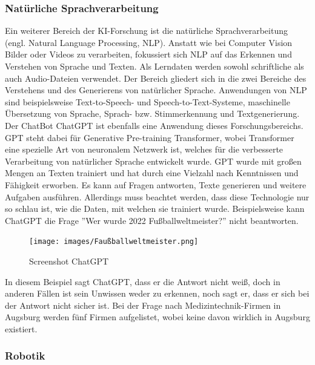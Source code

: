 \documentclass[a4paper,12pt, german]{report}
\begin{document}
\subsubsection{Natürliche Sprachverarbeitung}  
 
Ein weiterer Bereich der KI-Forschung ist die natürliche Sprachverarbeitung (engl. Natural Language Processing, NLP). Anstatt wie bei Computer Vision Bilder oder Videos zu verarbeiten, fokussiert sich NLP auf das Erkennen und Verstehen von Sprache und Texten. Als Lerndaten werden sowohl schriftliche als auch Audio-Dateien verwendet. Der Bereich gliedert sich in die zwei Bereiche des Verstehens und des Generierens von natürlicher Sprache. 
Anwendungen von NLP sind beispielsweise Text-to-Speech- und Speech-to-Text-Systeme, maschinelle Übersetzung von Sprache, Sprach- bzw. Stimmerkennung und Textgenerierung.\cite{09} \newline
Der ChatBot ChatGPT ist ebenfalls eine Anwendung dieses Forschungsbereichs. GPT steht dabei für Generative Pre-training Transformer, wobei Transformer eine spezielle Art von neuronalem Netzwerk ist, welches für die verbesserte Verarbeitung von natürlicher Sprache entwickelt wurde. GPT wurde mit großen Mengen an Texten trainiert und hat durch eine Vielzahl nach Kenntnissen und Fähigkeit erworben. Es kann auf Fragen antworten, Texte generieren und weitere Aufgaben ausführen.\cite{04} 
Allerdings muss beachtet werden, dass diese Technologie nur so schlau ist, wie die Daten, mit welchen sie trainiert wurde. Beispielsweise kann ChatGPT die Frage ''Wer wurde 2022 Fußballweltmeister?'' nicht beantworten. 

\begin{figure}[H]
  \center
 \texttt{[image: images/Faußballweltmeister.png]}
  \caption[Screenshot ChatGPT]{Screenshot ChatGPT}
\end{figure}

In diesem Beispiel sagt ChatGPT, dass er die Antwort nicht weiß, doch in anderen Fällen ist sein Unwissen weder zu erkennen, noch sagt er, dass er sich bei der Antwort nicht sicher ist. Bei der Frage nach Medizintechnik-Firmen in Augsburg werden fünf Firmen aufgelistet, wobei keine davon wirklich in Augsburg existiert.

\subsubsection{Robotik} 
\end{document}
